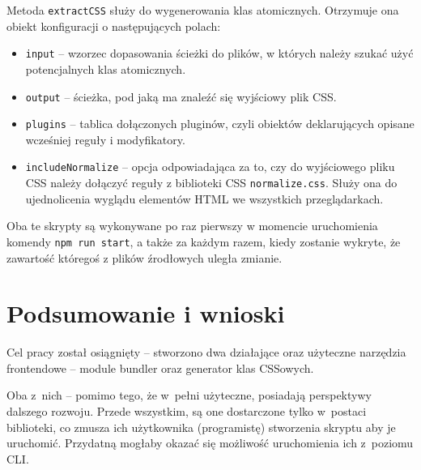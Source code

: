 \documentclass{SGGW-thesis}
\begin{document}
Metoda \verb|extractCSS| służy do wygenerowania klas atomicznych. Otrzymuje ona obiekt konfiguracji o następujących polach:
\begin{itemize}
    \item \verb|input| -- wzorzec dopasowania ścieżki do plików, w których należy szukać użyć potencjalnych klas atomicznych.
    \item \verb|output| -- ścieżka, pod jaką ma znaleźć się wyjściowy plik CSS.
    \item \verb|plugins| -- tablica dołączonych pluginów, czyli obiektów deklarujących opisane wcześniej reguły i modyfikatory.
    \item \verb|includeNormalize| -- opcja odpowiadająca za to, czy do wyjściowego pliku CSS należy dołączyć reguły z biblioteki CSS \verb|normalize.css|. Służy ona do ujednolicenia wyglądu elementów HTML we wszystkich przeglądarkach.
\end{itemize}

Oba te skrypty są wykonywane po raz pierwszy w momencie uruchomienia komendy \verb|npm run start|, a także za każdym razem, kiedy zostanie wykryte, że zawartość któregoś z plików źrodłowych uległa zmianie.

\chapter{Podsumowanie i wnioski}
Cel pracy został osiągnięty -- stworzono dwa działające oraz użyteczne narzędzia frontendowe -- module bundler oraz generator klas CSSowych.

Oba z~nich -- pomimo tego, że w~pełni użyteczne, posiadają perspektywy dalszego rozwoju.
Przede wszystkim, są one dostarczone tylko w~postaci biblioteki, co zmusza ich użytkownika (programistę) stworzenia skryptu aby je uruchomić. Przydatną mogłaby okazać się możliwość uruchomienia ich z~poziomu CLI.
\end{document}
